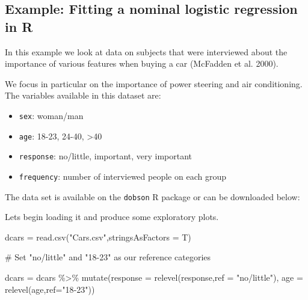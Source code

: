 \documentclass[
  letterpaper,
  DIV=11,
  numbers=noendperiod]{scrartcl}
\newenvironment{Shaded}{\begin{snugshade}}{\end{snugshade}}
\newcommand{\AttributeTok}[1]{\textcolor[rgb]{0.40,0.45,0.13}{#1}}
\newcommand{\CommentTok}[1]{\textcolor[rgb]{0.37,0.37,0.37}{#1}}
\newcommand{\FunctionTok}[1]{\textcolor[rgb]{0.28,0.35,0.67}{#1}}
\newcommand{\NormalTok}[1]{\textcolor[rgb]{0.00,0.23,0.31}{#1}}
\newcommand{\OtherTok}[1]{\textcolor[rgb]{0.00,0.23,0.31}{#1}}
\newcommand{\SpecialCharTok}[1]{\textcolor[rgb]{0.37,0.37,0.37}{#1}}
\newcommand{\StringTok}[1]{\textcolor[rgb]{0.13,0.47,0.30}{#1}}
\providecommand{\tightlist}{%
  \setlength{\itemsep}{0pt}\setlength{\parskip}{0pt}}\usepackage{longtable,booktabs,array}
\begin{document}
\subsection{Example: Fitting a nominal logistic regression in
R}\label{example-fitting-a-nominal-logistic-regression-in-r}

In this example we look at data on subjects that were interviewed about
the importance of various features when buying a car (McFadden et al.
2000).

We focus in particular on the importance of power steering and air
conditioning. The variables available in this dataset are:

\begin{itemize}
\tightlist
\item
  \texttt{sex}: woman/man
\item
  \texttt{age}: 18-23, 24-40, \textgreater40
\item
  \texttt{response}: no/little, important, very important
\item
  \texttt{frequency}: number of interviewed people on each group
\end{itemize}

The data set is available on the \texttt{dobson} R package or can be
downloaded below:

Lets begin loading it and produce some exploratory plots.

\begin{Shaded}
\begin{Highlighting}[]
\NormalTok{dcars }\OtherTok{=} \FunctionTok{read.csv}\NormalTok{(}\StringTok{"Cars.csv"}\NormalTok{,}\AttributeTok{stringsAsFactors =}\NormalTok{ T)}

\CommentTok{\# Set "no/little" and "18{-}23"  as our reference categories}

\NormalTok{dcars }\OtherTok{=}\NormalTok{ dcars }\SpecialCharTok{\%\textgreater{}\%}
  \FunctionTok{mutate}\NormalTok{(}\AttributeTok{response =} \FunctionTok{relevel}\NormalTok{(response,}\AttributeTok{ref =} \StringTok{"no/little"}\NormalTok{),}
         \AttributeTok{age =} \FunctionTok{relevel}\NormalTok{(age,}\AttributeTok{ref=}\StringTok{"18{-}23"}\NormalTok{)) }
\end{Highlighting}
\end{Shaded}
\end{document}
